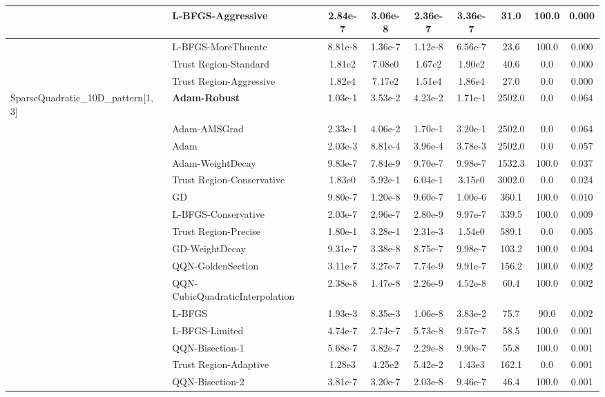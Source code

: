 \documentclass[10pt]{article}
\begin{document}
\begin{longtable}{|l|l|c|c|c|c|c|c|c|}
\hline
 & L-BFGS-Aggressive & 2.84e-7 & 3.06e-8 & 2.36e-7 & 3.36e-7 & 31.0 & 100.0 & 0.000 \\
\hline
 & L-BFGS-MoreThuente & 8.81e-8 & 1.36e-7 & 1.12e-8 & 6.56e-7 & 23.6 & 100.0 & 0.000 \\
\hline
 & Trust Region-Standard & 1.81e2 & 7.08e0 & 1.67e2 & 1.90e2 & 40.6 & 0.0 & 0.000 \\
\hline
 & Trust Region-Aggressive & 1.82e4 & 7.17e2 & 1.51e4 & 1.86e4 & 27.0 & 0.0 & 0.000 \\
SparseQuadratic\_10D\_pattern[1, 3] & \textbf{Adam-Robust} & 1.03e-1 & 3.53e-2 & 4.23e-2 & 1.71e-1 & 2502.0 & 0.0 & 0.064 \\
\hline
 & Adam-AMSGrad & 2.33e-1 & 4.06e-2 & 1.70e-1 & 3.20e-1 & 2502.0 & 0.0 & 0.064 \\
\hline
 & Adam & 2.03e-3 & 8.81e-4 & 3.96e-4 & 3.78e-3 & 2502.0 & 0.0 & 0.057 \\
\hline
 & Adam-WeightDecay & 9.83e-7 & 7.84e-9 & 9.70e-7 & 9.98e-7 & 1532.3 & 100.0 & 0.037 \\
\hline
 & Trust Region-Conservative & 1.83e0 & 5.92e-1 & 6.04e-1 & 3.15e0 & 3002.0 & 0.0 & 0.024 \\
\hline
 & GD & 9.80e-7 & 1.20e-8 & 9.60e-7 & 1.00e-6 & 360.1 & 100.0 & 0.010 \\
\hline
 & L-BFGS-Conservative & 2.03e-7 & 2.96e-7 & 2.80e-9 & 9.97e-7 & 339.5 & 100.0 & 0.009 \\
\hline
 & Trust Region-Precise & 1.80e-1 & 3.28e-1 & 2.31e-3 & 1.54e0 & 589.1 & 0.0 & 0.005 \\
\hline
 & GD-WeightDecay & 9.31e-7 & 3.38e-8 & 8.75e-7 & 9.98e-7 & 103.2 & 100.0 & 0.004 \\
\hline
 & QQN-GoldenSection & 3.11e-7 & 3.27e-7 & 7.74e-9 & 9.91e-7 & 156.2 & 100.0 & 0.002 \\
\hline
 & QQN-CubicQuadraticInterpolation & 2.38e-8 & 1.47e-8 & 2.26e-9 & 4.52e-8 & 60.4 & 100.0 & 0.002 \\
\hline
 & L-BFGS & 1.93e-3 & 8.35e-3 & 1.06e-8 & 3.83e-2 & 75.7 & 90.0 & 0.002 \\
\hline
 & L-BFGS-Limited & 4.74e-7 & 2.74e-7 & 5.73e-8 & 9.57e-7 & 58.5 & 100.0 & 0.001 \\
\hline
 & QQN-Bisection-1 & 5.68e-7 & 3.82e-7 & 2.29e-8 & 9.90e-7 & 55.8 & 100.0 & 0.001 \\
\hline
 & Trust Region-Adaptive & 1.28e3 & 4.25e2 & 5.42e-2 & 1.43e3 & 162.1 & 0.0 & 0.001 \\
\hline
 & QQN-Bisection-2 & 3.81e-7 & 3.20e-7 & 2.03e-8 & 9.46e-7 & 46.4 & 100.0 & 0.001 \\

\end{longtable}
\end{document}
